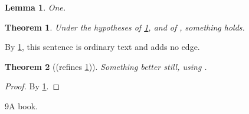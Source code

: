 \documentclass{article}
\newtheorem{theorem}{Theorem}
\newtheorem{lemma}{Lemma}
\begin{document}
\begin{lemma}\label{l1}One.\end{lemma}

\begin{theorem}\label{t1}
  Under the hypotheses of \ref{l1}, and of \cite[Thm~2]{bk}, something holds.
\end{theorem}

By \ref{l1}, this sentence is ordinary text and adds no edge.

\begin{theorem}[(refines \ref{t1})]\label{t2}
  Something better still, using \cite{bk}.
\end{theorem}
\begin{proof}By \ref{l1}.\end{proof}

\begin{thebibliography}{9}A book.\end{thebibliography}
\end{document}
